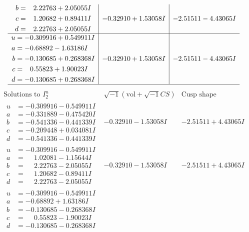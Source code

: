 \documentclass[1p]{elsarticle_modified}
\theoremstyle{definition}
\newcommand{\I}{\sqrt{-1}}
\begin{document}
$$\begin{array}{c|c|c}
\begin{aligned}
b &= \phantom{-}2.22763 + 2.05055 I \\
c &= \phantom{-}1.20682 + 0.89411 I \\
d &= \phantom{-}2.22763 + 2.05055 I\end{aligned}
 & -0.32910 + 1.53058 I & -2.51511 - 4.43065 I \\ \hline\begin{aligned}
u &= -0.309916 + 0.549911 I \\
a &= -0.68892 - 1.63186 I \\
b &= -0.130685 + 0.268368 I \\
c &= \phantom{-}0.55823 + 1.90023 I \\
d &= -0.130685 + 0.268368 I\end{aligned}
 & -0.32910 + 1.53058 I & -2.51511 - 4.43065 I\\
 \hline 
 \end{array}$$\newpage$$\begin{array}{c|c|c}  
\text{Solutions to }I^u_{2}& \I (\text{vol} + \sqrt{-1}CS) & \text{Cusp shape}\\
 \hline 
\begin{aligned}
u &= -0.309916 - 0.549911 I \\
a &= -0.331889 - 0.475420 I \\
b &= -0.541336 - 0.441339 I \\
c &= -0.209448 + 0.034081 I \\
d &= -0.541336 - 0.441339 I\end{aligned}
 & -0.32910 - 1.53058 I & -2.51511 + 4.43065 I \\ \hline\begin{aligned}
u &= -0.309916 - 0.549911 I \\
a &= \phantom{-}1.02081 - 1.15644 I \\
b &= \phantom{-}2.22763 - 2.05055 I \\
c &= \phantom{-}1.20682 - 0.89411 I \\
d &= \phantom{-}2.22763 - 2.05055 I\end{aligned}
 & -0.32910 - 1.53058 I & -2.51511 + 4.43065 I \\ \hline\begin{aligned}
u &= -0.309916 - 0.549911 I \\
a &= -0.68892 + 1.63186 I \\
b &= -0.130685 - 0.268368 I \\
c &= \phantom{-}0.55823 - 1.90023 I \\
d &= -0.130685 - 0.268368 I\end{aligned}

\end{array}$$
\end{document}
